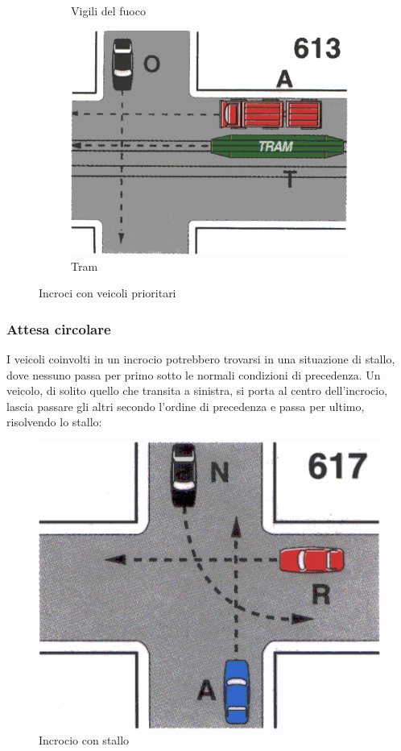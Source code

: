 \begin{figure}[htbp!]
\begin{subfigure}{.3\textwidth}
		\caption{Vigili del fuoco}
		\label{fig:fire}
	\end{subfigure}
	\begin{subfigure}{.3\textwidth}
		\includegraphics[width=\textwidth]{./images/tram}
		\caption{Tram}
		\label{fig:tram}
	\end{subfigure}
	\caption{Incroci con veicoli prioritari}
	\label{fig:prior}
\end{figure}

\subsubsection{Attesa circolare}
\label{sssec:lock}
I veicoli coinvolti in un incrocio potrebbero trovarsi in una situazione di stallo, dove nessuno passa per primo sotto le normali condizioni di precedenza. Un veicolo, di solito quello che transita a sinistra, si porta al centro dell'incrocio, lascia passare gli altri secondo l'ordine di precedenza e passa per ultimo, risolvendo lo stallo:

\begin{figure}[htb]
	\centering
	\includegraphics[width=.5\textwidth]{images/lock}
	\caption{Incrocio con stallo}
\end{figure}

